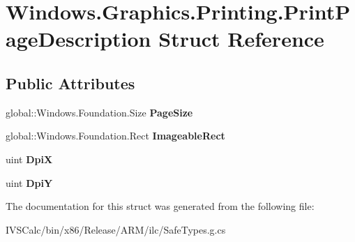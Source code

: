 \hypertarget{struct_windows_1_1_graphics_1_1_printing_1_1_print_page_description}{}\section{Windows.\+Graphics.\+Printing.\+Print\+Page\+Description Struct Reference}
\label{struct_windows_1_1_graphics_1_1_printing_1_1_print_page_description}
\subsection*{Public Attributes}
\begin{DoxyCompactItemize}
\item 
\mbox{\label{struct_windows_1_1_graphics_1_1_printing_1_1_print_page_description_abb8cc7b801f6dbdf15d2f3683080d42c}} 
global\+::\+Windows.\+Foundation.\+Size {\bfseries Page\+Size}
\item 
\mbox{\label{struct_windows_1_1_graphics_1_1_printing_1_1_print_page_description_a6586bba003a12c990926922b21e15a4e}} 
global\+::\+Windows.\+Foundation.\+Rect {\bfseries Imageable\+Rect}
\item 
\mbox{\label{struct_windows_1_1_graphics_1_1_printing_1_1_print_page_description_a8ba1f5edfd2a8d334482e158b7526980}} 
uint {\bfseries DpiX}
\item 
\mbox{\label{struct_windows_1_1_graphics_1_1_printing_1_1_print_page_description_a621a748384e3839dd7a684444634f952}} 
uint {\bfseries DpiY}
\end{DoxyCompactItemize}


The documentation for this struct was generated from the following file\+:\begin{DoxyCompactItemize}
\item 
I\+V\+S\+Calc/bin/x86/\+Release/\+A\+R\+M/ilc/Safe\+Types.\+g.\+cs\end{DoxyCompactItemize}
